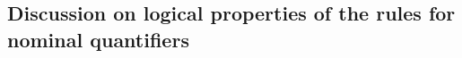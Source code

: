 \documentclass[UKenglish,acmsmall,authorversion]{acmart}
\theoremstyle{plain}
\begin{document}

\subsection{Discussion on logical properties of the rules for nominal quantifiers}
\label{section:nominal}
\end{document}
